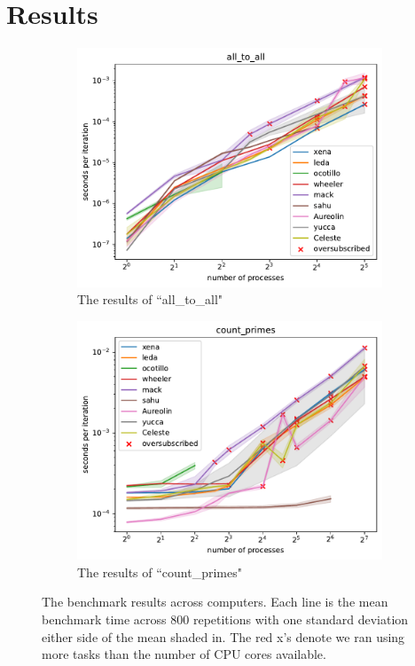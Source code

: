 \documentclass{article}
\begin{document}
\section{Results}

\begin{figure}[h]
    \centering
    \begin{subfigure}[b]{0.49\textwidth}
         \centering
         \includegraphics[width=\textwidth]{figures/final/all_to_all.pdf}
         \caption{The results of ``all\_to\_all"}
         \label{fig:all_to_all}
     \end{subfigure}
     \hfill
     \begin{subfigure}[b]{0.49\textwidth}
         \centering
         \includegraphics[width=\textwidth]{figures/final/count_primes.pdf}
         \caption{The results of ``count\_primes"}
         \label{fig:count_primes}
     \end{subfigure}
     \hfill
    \caption{The benchmark results across computers. Each line is the mean benchmark time across 800 repetitions with one standard deviation either side of the mean shaded in. The red x's denote we ran using more tasks than the number of CPU cores available. }
    \label{fig:direct}
\end{figure}
\end{document}

